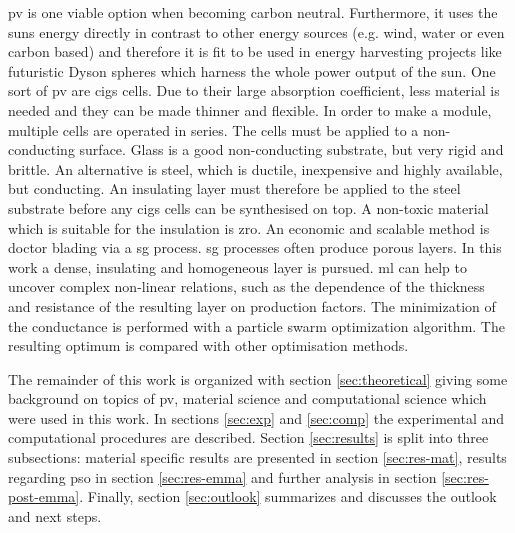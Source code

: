 \Gls{pv} is one viable option when becoming carbon neutral. 
Furthermore, 
it uses the suns energy directly in contrast to other energy sources (e.g. wind, water or even carbon based) and therefore 
it is fit to be used in energy harvesting projects like futuristic Dyson spheres\cite{dyson1960search} which harness the whole power output of the sun.
%
One sort of \gls{pv} are \gls{cigs}\cite{Vasekar2010} cells. 
Due to their large absorption coefficient, less material is needed and they can be made thinner and flexible. 
In order to make a module, multiple cells are operated in series. 
The cells must be applied to a non-conducting surface.
Glass is a good non-conducting substrate, but very rigid and brittle. 
An alternative is steel, which is ductile, inexpensive and highly available, but conducting. 
An insulating layer must therefore be applied to the steel substrate before any \gls{cigs} cells can be synthesised on top.
A non-toxic material which is suitable for the insulation is \gls{zro}. 
An economic and scalable method is doctor blading via a \gls{sg} process. 
\gls{sg} processes often produce porous layers. 
In this work a dense, insulating and homogeneous layer is pursued. 
\Gls{ml} can help to uncover complex non-linear relations, such as the 
dependence of the thickness and resistance of the resulting layer on production factors.
The minimization of the conductance is performed with a particle swarm optimization 
algorithm. 
The resulting optimum is compared with other optimisation methods.


The remainder of this work is organized with section 
\ref{sec:theoretical} giving 
some background on topics of \gls{pv}, material science and computational science which were used in this work.
In sections \ref{sec:exp} and \ref{sec:comp} the experimental and computational procedures are described. 
Section \ref{sec:results} is split into three subsections: material specific results are presented in section \ref{sec:res-mat}, results regarding \gls{pso} in section \ref{sec:res-emma} and further analysis in section \ref{sec:res-post-emma}.
Finally, section \ref{sec:outlook} summarizes and discusses the outlook and next steps.


